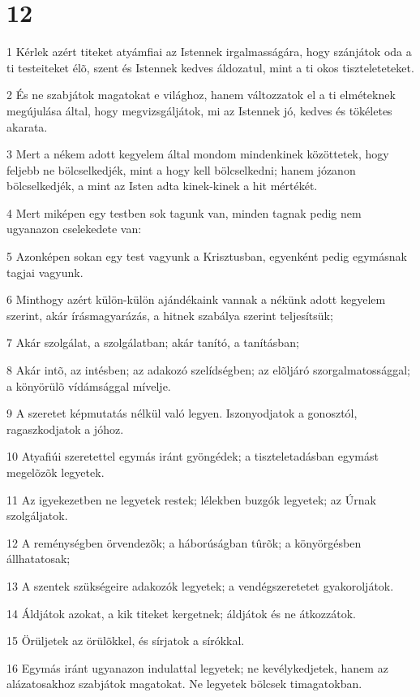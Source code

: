 \chapter{12}

\par 1 Kérlek azért titeket atyámfiai az Istennek irgalmasságára, hogy szánjátok oda a ti testeiteket élõ, szent és Istennek kedves áldozatul, mint a ti okos tiszteleteteket.
\par 2 És ne szabjátok magatokat e világhoz, hanem változzatok el a ti elméteknek megújulása által, hogy megvizsgáljátok, mi az Istennek jó, kedves és tökéletes akarata.
\par 3 Mert a nékem adott kegyelem által mondom mindenkinek közöttetek, hogy feljebb ne bölcselkedjék, mint a hogy kell bölcselkedni; hanem józanon bölcselkedjék, a mint az Isten adta kinek-kinek a  hit mértékét.
\par 4 Mert miképen egy testben sok tagunk van, minden tagnak pedig nem ugyanazon cselekedete van:
\par 5 Azonképen sokan egy test vagyunk a Krisztusban, egyenként pedig egymásnak tagjai vagyunk.
\par 6 Minthogy azért külön-külön ajándékaink vannak a nékünk adott kegyelem szerint, akár írásmagyarázás, a hitnek szabálya szerint teljesítsük;
\par 7 Akár szolgálat, a szolgálatban; akár tanító, a tanításban;
\par 8 Akár intõ, az intésben; az adakozó szelídségben; az elõljáró szorgalmatossággal; a könyörülõ vídámsággal mívelje.
\par 9 A szeretet képmutatás nélkül való legyen. Iszonyodjatok a gonosztól, ragaszkodjatok a jóhoz.
\par 10 Atyafiúi szeretettel egymás iránt gyöngédek; a tiszteletadásban egymást megelõzõk legyetek.
\par 11 Az igyekezetben ne legyetek restek; lélekben buzgók legyetek; az Úrnak szolgáljatok.
\par 12 A reménységben örvendezõk; a háborúságban tûrõk;  a könyörgésben állhatatosak;
\par 13 A szentek szükségeire adakozók legyetek; a vendégszeretetet  gyakoroljátok.
\par 14 Áldjátok azokat, a kik titeket kergetnek; áldjátok és ne átkozzátok.
\par 15 Örüljetek az örülõkkel, és sírjatok a sírókkal.
\par 16 Egymás iránt ugyanazon indulattal legyetek; ne kevélykedjetek, hanem az alázatosakhoz szabjátok magatokat. Ne legyetek bölcsek  timagatokban.
